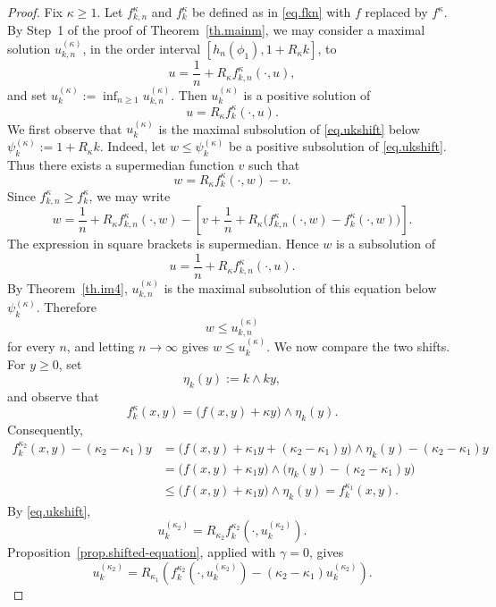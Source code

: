 \documentclass[11pt,a4paper,reqno]{amsart}
\theoremstyle{definition}
\numberwithin{equation}{section}
\begin{document}
\begin{proof}
Fix $\kappa\ge1$. Let  $f_{k,n}^\kappa$ and $f_k^\kappa$ be defined as in \eqref{eq.fkn} 
with $f$ replaced by $f^\kappa$. By Step~1 of the proof of Theorem~\ref{th.mainm}, we may 
consider a maximal solution $u_{k,n}^{(\kappa)}$,
in the order interval $[h_n(\phi_1),1+R_\kappa k]$, to 
\[
u=\frac1n+R_\kappa f_{k,n}^\kappa(\cdot,u),
\]
and set $u_k^{(\kappa)}:= \inf_{n\ge 1} u_{k,n}^{(\kappa)}$. Then $u_k^{(\kappa)}$ is a  positive solution of
\begin{equation}
\label{eq.ukshift}
u=R_\kappa f_k^\kappa(\cdot,u).
\end{equation}
We first observe that $u_k^{(\kappa)}$ is the maximal subsolution of
\eqref{eq.ukshift} below $\psi_k^{(\kappa)}:= 1+R_\kappa k$.
Indeed, let $w\le\psi_k^{(\kappa)}$ be a positive subsolution of
\eqref{eq.ukshift}. Thus there exists a supermedian function $v$ such
that
\[
w=R_\kappa f_k^\kappa(\cdot,w)-v.
\]
Since $f_{k,n}^\kappa\ge f_k^\kappa$, we may write
\[
w=\frac1n+R_\kappa f_{k,n}^\kappa(\cdot,w)-\left[v+\frac1n+R_\kappa\bigl(f_{k,n}^\kappa(\cdot,w)-f_k^\kappa(\cdot,w)\bigr)\right].
\]
The expression in square brackets is supermedian. Hence $w$ is a subsolution of
\[
u=\frac1n+R_\kappa f_{k,n}^\kappa(\cdot,u).
\]
By Theorem~\ref{th.im4}, $u_{k,n}^{(\kappa)}$ is the maximal
subsolution of this equation below $\psi_k^{(\kappa)}$. Therefore
\[
w\le u_{k,n}^{(\kappa)}
\]
for every $n$, and letting $n\to\infty$ gives $w\le u_k^{(\kappa)}$.
We now compare the two shifts. 
For $y\ge0$, set
\[
\eta_k(y):=k\wedge ky,
\]
and observe that 
\[
f_k^\kappa(x,y)
=
\bigl(f(x,y)+\kappa y\bigr)\wedge \eta_k(y).
\]
Consequently,
\begin{equation}
\label{eq.shiftorder}
\begin{split}
f_k^{\kappa_2}(x,y)-(\kappa_2-\kappa_1)y
&=
\bigl(f(x,y)+\kappa_1y+(\kappa_2-\kappa_1)y\bigr)\wedge \eta_k(y)-(\kappa_2-\kappa_1)y\\
&=
\bigl(f(x,y)+\kappa_1y\bigr)
\wedge
\bigl(\eta_k(y)-(\kappa_2-\kappa_1)y\bigr)
\\&\le
\bigl(f(x,y)+\kappa_1y\bigr)\wedge \eta_k(y)
=
f_k^{\kappa_1}(x,y).
\end{split}
\end{equation}
By \eqref{eq.ukshift},
\[
u_k^{(\kappa_2)}=R_{\kappa_2}f_k^{\kappa_2}(\cdot,u_k^{(\kappa_2)}).
\]
Proposition~\ref{prop.shifted-equation}, applied with $\gamma=0$,
gives
\begin{equation}
\label{eq.shiftback}
u_k^{(\kappa_2)}=R_{\kappa_1}\left(f_k^{\kappa_2}(\cdot,u_k^{(\kappa_2)})-(\kappa_2-\kappa_1)u_k^{(\kappa_2)}\right).

\end{equation}
\end{proof}
\end{document}
